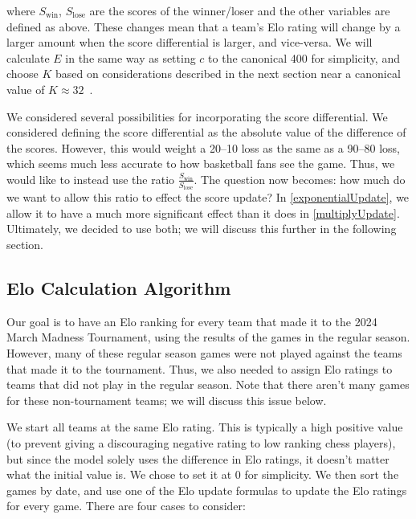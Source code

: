 \documentclass{article}
\begin{document}
where $S_{\text{win}}$, $S_{\text{lose}}$ are the scores of the winner/loser and the other variables are defined as above. These changes mean that a team's Elo rating will change by a larger amount when the score differential is larger, and vice-versa. We will calculate $E$ in the same way as setting $c$ to the canonical 400 for simplicity, and choose $K$ based on considerations described in the next section near a canonical value  of $K\approx 32$~\cite{mediumRatingSystem}.

We considered several possibilities for incorporating the score differential. We considered defining the score differential as the absolute value of the difference of the scores. However, this would weight a 20--10 loss as the same as a 90--80 loss, which seems much less accurate to how basketball fans see the game. Thus, we would like to instead use the ratio $\frac{S_{\text{win}}}{S_{\text{lose}}}$. The question now becomes: how much do we want to allow this ratio to effect the score update? In \autoref{exponentialUpdate}, we allow it to have a much more significant effect than it does in \autoref{multiplyUpdate}. Ultimately, we decided to use both; we will discuss this further in the following section.

\subsection{Elo Calculation Algorithm}
Our goal is to have an Elo ranking for every team that made it to the 2024 March Madness Tournament, using the results of the games in the regular season. However, many of these regular season games were not played against the teams that made it to the tournament. Thus, we also needed to assign Elo ratings to teams that did not play in the regular season. Note that there aren't many games for these non-tournament teams; we will discuss this issue below. 

We start all teams at the same Elo rating. This is typically a high positive value (to prevent giving a discouraging negative rating to low ranking chess players), but since the model solely uses the difference in Elo ratings, it doesn't matter what the initial value is. We chose to set it at 0 for simplicity. We then sort the games by date, and use one of the Elo update formulas to update the Elo ratings for every game. There are four cases to consider:
\end{document}
